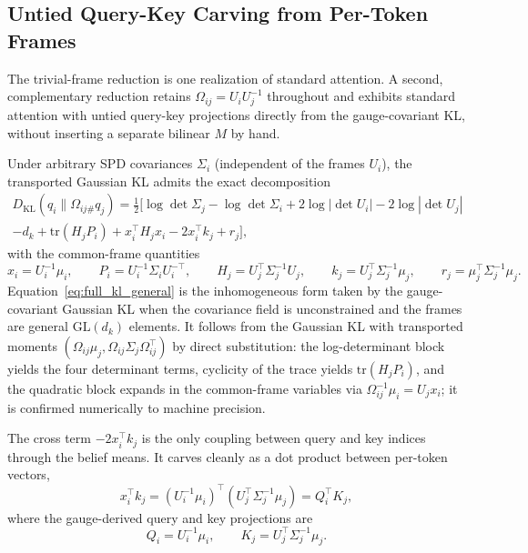 \documentclass[11pt]{article}
\begin{document}
\subsection{Untied Query-Key Carving from Per-Token Frames}
\label{sec:untied_qk}

The trivial-frame reduction is one realization of standard attention. A second, complementary reduction retains $\Omega_{ij} = U_iU_j^{-1}$ throughout and exhibits standard attention with untied query-key projections directly from the gauge-covariant KL, without inserting a separate bilinear $M$ by hand.

Under arbitrary SPD covariances $\Sigma_i$ (independent of the frames $U_i$), the transported Gaussian KL admits the exact decomposition
\begin{multline}
D_{\mathrm{KL}}(q_i \| \Omega_{ij\#}q_j) = \tfrac{1}{2}\Big[\log\det\Sigma_j - \log\det\Sigma_i + 2\log|\det U_i| - 2\log|\det U_j| \\
 - d_k + \mathrm{tr}(H_j P_i) + x_i^\top H_j x_i - 2x_i^\top k_j + r_j\Big],
\label{eq:full_kl_general}
\end{multline}
with the common-frame quantities
\begin{equation}
x_i = U_i^{-1}\mu_i, \qquad P_i = U_i^{-1}\Sigma_i U_i^{-\top}, \qquad H_j = U_j^\top \Sigma_j^{-1} U_j, \qquad k_j = U_j^\top \Sigma_j^{-1}\mu_j, \qquad r_j = \mu_j^\top \Sigma_j^{-1}\mu_j.
\end{equation}
Equation~\eqref{eq:full_kl_general} is the inhomogeneous form taken by the gauge-covariant Gaussian KL when the covariance field is unconstrained and the frames are general $\mathrm{GL}(d_k)$ elements. It follows from the Gaussian KL with transported moments $(\Omega_{ij}\mu_j, \Omega_{ij}\Sigma_j\Omega_{ij}^\top)$ by direct substitution: the log-determinant block yields the four determinant terms, cyclicity of the trace yields $\mathrm{tr}(H_jP_i)$, and the quadratic block expands in the common-frame variables via $\Omega_{ij}^{-1}\mu_i = U_jx_i$; it is confirmed numerically to machine precision.

The cross term $-2x_i^\top k_j$ is the only coupling between query and key indices through the belief means. It carves cleanly as a dot product between per-token vectors,
\begin{equation}
x_i^\top k_j = (U_i^{-1}\mu_i)^\top (U_j^\top \Sigma_j^{-1}\mu_j) = Q_i^\top K_j,
\label{eq:untied_cross_term}
\end{equation}
where the gauge-derived query and key projections are
\begin{equation}
\boxed{Q_i = U_i^{-1}\mu_i, \qquad K_j = U_j^\top \Sigma_j^{-1}\mu_j.}
\label{eq:gauge_qk}
\end{equation}
\end{document}

